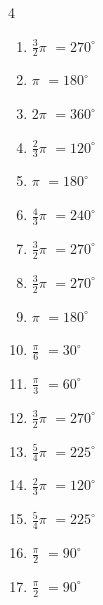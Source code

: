 \begin{multicols}{4}
\begin{enumerate}
\columnbreak %

  \item $\displaystyle \frac{3}{2}\pi$
        $\displaystyle =270^{\circ}$

  \item $\displaystyle \pi$
        $\displaystyle =180^{\circ}$

  \item $\displaystyle 2\pi$
        $\displaystyle =360^{\circ}$

  \item $\displaystyle \frac{2}{3}\pi$
        $\displaystyle =120^{\circ}$

  \item $\displaystyle \pi$
        $\displaystyle =180^{\circ}$

  \item $\displaystyle \frac{4}{3}\pi$
        $\displaystyle =240^{\circ}$

  \item $\displaystyle \frac{3}{2}\pi$
        $\displaystyle =270^{\circ}$

  \item $\displaystyle \frac{3}{2}\pi$
        $\displaystyle =270^{\circ}$

  \item $\displaystyle \pi$
        $\displaystyle =180^{\circ}$

  \item $\displaystyle \frac{\pi}{6}$
        $\displaystyle =30^{\circ}$

  \item $\displaystyle \frac{\pi}{3}$
        $\displaystyle =60^{\circ}$

  \item $\displaystyle \frac{3}{2}\pi$
        $\displaystyle =270^{\circ}$

  \item $\displaystyle \frac{5}{4}\pi$
        $\displaystyle =225^{\circ}$

  \item $\displaystyle \frac{2}{3}\pi$
        $\displaystyle =120^{\circ}$

  \item $\displaystyle \frac{5}{4}\pi$
        $\displaystyle =225^{\circ}$

  \item $\displaystyle \frac{\pi}{2}$
        $\displaystyle =90^{\circ}$

  \item $\displaystyle \frac{\pi}{2}$
        $\displaystyle =90^{\circ}$


\end{enumerate}
\end{multicols}
